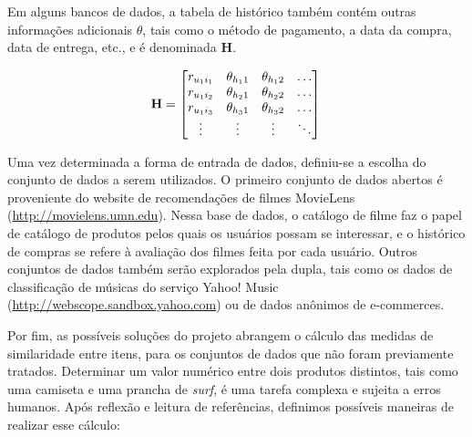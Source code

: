 Em alguns bancos de dados, a tabela de histórico também contém outras informações adicionais $\theta$, tais como o método de pagamento, a data da compra, data de entrega, etc., e é denominada $\mathbf{H}$.

\begin{equation} 
\mathbf{H} =
\begin{bmatrix} 
 r_{u_1 i_1} &  \theta_{h_1 1} &  \theta_{h_1 2} & \dots   \\
 r_{u_1 i_2} &  \theta_{h_2 1} &  \theta_{h_2 2} & \dots   \\
 r_{u_1 i_3} &  \theta_{h_3 1} &  \theta_{h_3 2} & \dots   \\
 \vdots &  \vdots &  \vdots  & \ddots   \\
 \end{bmatrix} \\
\end{equation}


Uma vez determinada a forma de entrada de dados, definiu-se a escolha do conjunto de dados a serem utilizados. O primeiro conjunto de dados abertos é proveniente do website de recomendações de filmes MovieLens (\url{http://movielens.umn.edu}). Nessa base de dados, o catálogo de filme faz o papel de catálogo de produtos pelos quais os usuários possam se interessar, e o histórico de compras se refere à avaliação dos filmes feita por cada usuário. Outros conjuntos de dados também serão  explorados pela dupla, tais como os dados de classificação de músicas do serviço Yahoo! Music (\url{http://webscope.sandbox.yahoo.com}) ou de dados anônimos de e-commerces.

Por fim, as possíveis soluções do projeto abrangem o cálculo das medidas de similaridade entre itens, para os conjuntos de dados que não foram previamente tratados. Determinar um valor numérico entre dois produtos distintos, tais como uma camiseta e uma prancha de \textit{surf}, é uma tarefa complexa e sujeita a erros humanos. Após reflexão e leitura de referências, definimos possíveis maneiras de realizar esse cálculo: 

